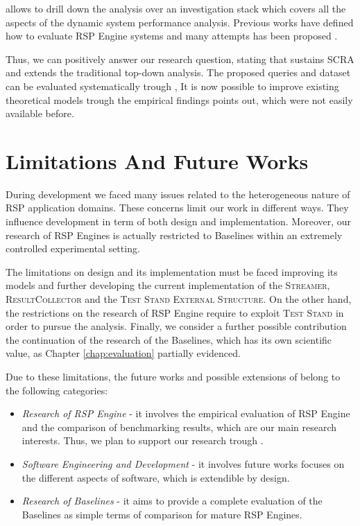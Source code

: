 \noindent \name allows to drill down the analysis over an investigation stack which covers all the aspects of the dynamic system performance analysis. Previous works have defined how to evaluate RSP Engine systems \cite{DBLP:conf/esws/ScharrenbachUMVB13} and many attempts has been proposed \cite{Zhang2012, LePhuoc2012c, DBLP:conf/semweb/DellAglioCBCV13}. 

Thus, we can positively answer   our research question, stating that \name sustains SCRA and extends the traditional top-down analysis. The proposed queries and dataset can be evaluated systematically trough \namens, It is now possible to improve existing theoretical models trough the empirical findings \name points out, which were not easily available before.


\section{Limitations And Future Works}\label{sec:research-fw-conclusion}

During \name development we faced many issues related to the heterogeneous nature of RSP application domains. These concerns limit our work in different ways. They influence \name development in term of both design and implementation. Moreover, our research of RSP Engines  is actually restricted to \name Baselines within an extremely controlled experimental setting.

The limitations on \name design and its implementation must be faced improving its models and further developing the current implementation of the \textsc{Streamer}, \textsc{ResultCollector} and the \textsc{Test Stand External Structure}. On the other hand, the restrictions on the research of RSP Engine require to exploit \name \textsc{Test Stand} in order to pursue the analysis. Finally, we consider a further possible contribution the continuation of the research of the Baselines, which has its own scientific value, as Chapter \ref{chap:evaluation} partially evidenced.

Due to these limitations, the future works and possible extensions of \name belong to the following categories:
\begin{itemize}
\item \textit{Research of RSP Engine} - it involves the empirical evaluation of RSP Engine and the comparison of benchmarking results, which are our main research interests. Thus, we plan to support our research trough \namens.
\item \textit{Software Engineering and Development} - it involves future works focuses on the different aspects of \name software, which is extendible by design.
\item \textit{Research of Baselines} - it aims to provide a complete evaluation of the Baselines as simple terms of comparison for mature RSP Engines.
\end{itemize}

